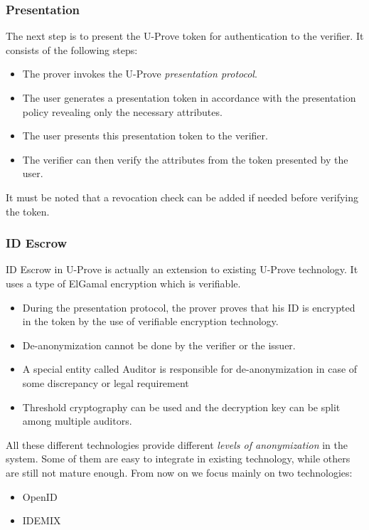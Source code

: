 \subsubsection{Presentation}
The next step is to present the U-Prove token for authentication to the verifier. It consists of the following steps:
\begin{itemize}
	\item The prover invokes the U-Prove \textit{presentation protocol}.
	\item The user generates a presentation token in accordance with the presentation policy revealing only the necessary attributes. 
	\item The user presents this presentation token to the verifier.
	\item The verifier can then verify the attributes from the token presented by the user.
\end{itemize}
It must be noted that a revocation check can be added if needed before verifying the token.
\subsubsection{ID Escrow}
ID Escrow in U-Prove is actually an extension\cite{zaverucha2013u} to existing U-Prove technology. It uses a type of ElGamal encryption which is verifiable.
\begin{itemize}
	\item  During the presentation protocol, the prover proves that his ID is encrypted in the token by the use of verifiable encryption\cite{VE} technology.
	\item De-anonymization cannot be done by the verifier or the issuer.
	\item A special entity called Auditor is responsible for de-anonymization in case of some discrepancy or legal requirement
	\item Threshold cryptography\cite{DBLP:conf/acisp/DamgardJ03} can be used and the decryption key can be split among multiple auditors.
\end{itemize}

All these different technologies provide different \textit{levels of anonymization}\cite{goldberg2000pseudonymous} in the system. Some of them are easy to integrate in existing technology, while others are still not mature enough. From now on we focus mainly on two technologies:
\begin{itemize}
	\item OpenID
	\item IDEMIX
\end{itemize}